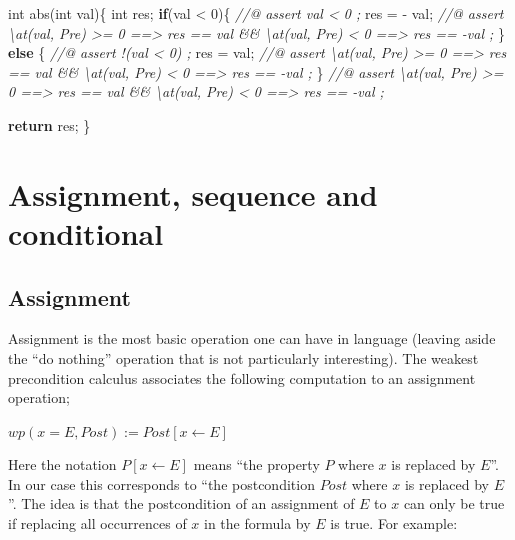 \documentclass[12pt,francais,]{scrbook}
\newenvironment{Shaded}{}{}
\newcommand{\KeywordTok}[1]{\textcolor[rgb]{0.00,0.44,0.13}{\textbf{{#1}}}}
\newcommand{\DataTypeTok}[1]{\textcolor[rgb]{0.56,0.13,0.00}{{#1}}}
\newcommand{\DecValTok}[1]{\textcolor[rgb]{0.25,0.63,0.44}{{#1}}}
\newcommand{\CommentTok}[1]{\textcolor[rgb]{0.38,0.63,0.69}{\textit{{#1}}}}
\newcommand{\NormalTok}[1]{{#1}}
\begin{document}
\begin{footnotesize}\begin{Shaded}
\begin{Highlighting}[]
\DataTypeTok{int} \NormalTok{abs(}\DataTypeTok{int} \NormalTok{val)\{}
  \DataTypeTok{int} \NormalTok{res;}
  \KeywordTok{if}\NormalTok{(val < }\DecValTok{0}\NormalTok{)\{}
    \CommentTok{//@ assert val < 0 ;}
    \NormalTok{res = - val;}
    \CommentTok{//@ assert \textbackslash{}at(val, Pre) >= 0 ==> res == val && \textbackslash{}at(val, Pre) < 0 ==> res == -val ;}
  \NormalTok{\} }\KeywordTok{else} \NormalTok{\{}
    \CommentTok{//@ assert !(val < 0) ;}
    \NormalTok{res = val;}
    \CommentTok{//@ assert \textbackslash{}at(val, Pre) >= 0 ==> res == val && \textbackslash{}at(val, Pre) < 0 ==> res == -val ;}
  \NormalTok{\}}
  \CommentTok{//@ assert \textbackslash{}at(val, Pre) >= 0 ==> res == val && \textbackslash{}at(val, Pre) < 0 ==> res == -val ;}

  \KeywordTok{return} \NormalTok{res;}
\NormalTok{\}}
\end{Highlighting}
\end{Shaded}\end{footnotesize}

\section{Assignment, sequence and
conditional}\label{assignment-sequence-and-conditional}

\subsection{Assignment}\label{assignment}

Assignment is the most basic operation one can have in language (leaving
aside the ``do nothing'' operation that is not particularly
interesting). The weakest precondition calculus associates the following
computation to an assignment operation;

\begin{center} \(wp(x = E , Post) := Post[x \leftarrow E]\)
\end{center}

Here the notation \(P[x \leftarrow E]\) means ``the property \(P\) where
\(x\) is replaced by \(E\)''. In our case this corresponds to ``the
postcondition \(Post\) where \(x\) is replaced by \(E\)''. The idea is
that the postcondition of an assignment of \(E\) to \(x\) can only be
true if replacing all occurrences of \(x\) in the formula by \(E\) is
true. For example:
\end{document}
